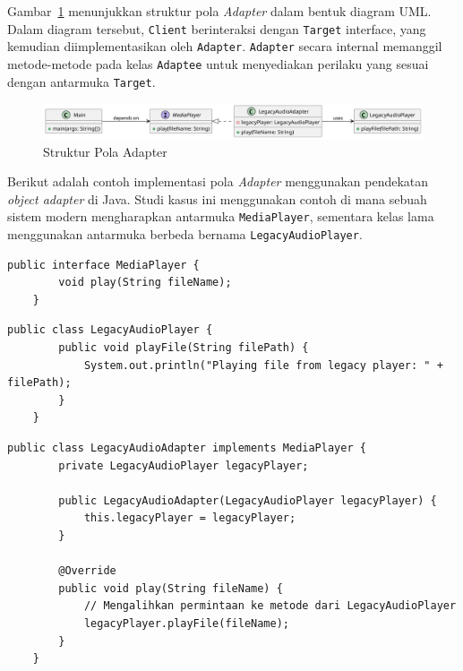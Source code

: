 Gambar~\ref{fig:adapter} menunjukkan struktur pola \textit{Adapter} dalam bentuk diagram UML. Dalam diagram tersebut, \texttt{Client} berinteraksi dengan \texttt{Target} interface, yang kemudian diimplementasikan oleh \texttt{Adapter}. \texttt{Adapter} secara internal memanggil metode-metode pada kelas \texttt{Adaptee} untuk menyediakan perilaku yang sesuai dengan antarmuka \texttt{Target}.

\begin{figure}[h]
	\centering
	\includegraphics[width=\textwidth]{../figures/out/adapter.png}
	\caption{Struktur Pola Adapter}
	\label{fig:adapter}
\end{figure}

Berikut adalah contoh implementasi pola \textit{Adapter} menggunakan pendekatan \textit{object adapter} di Java. Studi kasus ini menggunakan contoh di mana sebuah sistem modern mengharapkan antarmuka \texttt{MediaPlayer}, sementara kelas lama menggunakan antarmuka berbeda bernama \texttt{LegacyAudioPlayer}.

\begin{lstlisting}[style=JavaStyle, caption={Interface Target: MediaPlayer}, label={lst:adapter-target}]
	public interface MediaPlayer {
		void play(String fileName);
	}
\end{lstlisting}

\begin{lstlisting}[style=JavaStyle, caption={Kelas Legacy (Adaptee): LegacyAudioPlayer}, label={lst:adapter-adaptee}]
	public class LegacyAudioPlayer {
		public void playFile(String filePath) {
			System.out.println("Playing file from legacy player: " + filePath);
		}
	}
\end{lstlisting}

\begin{lstlisting}[style=JavaStyle, caption={Adapter: LegacyAudioAdapter}, label={lst:adapter-adapter}]
	public class LegacyAudioAdapter implements MediaPlayer {
		private LegacyAudioPlayer legacyPlayer;
		
		public LegacyAudioAdapter(LegacyAudioPlayer legacyPlayer) {
			this.legacyPlayer = legacyPlayer;
		}
		
		@Override
		public void play(String fileName) {
			// Mengalihkan permintaan ke metode dari LegacyAudioPlayer
			legacyPlayer.playFile(fileName);
		}
	}
\end{lstlisting}

